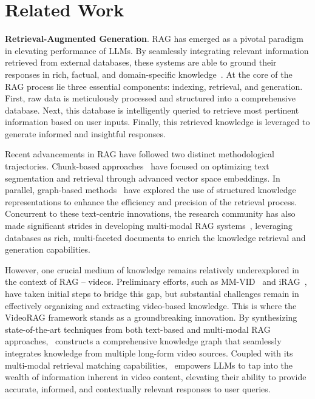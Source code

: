 \section{Related Work}

\textbf{Retrieval-Augmented Generation}. 
RAG has emerged as a pivotal paradigm in elevating performance of LLMs. By seamlessly integrating relevant information retrieved from external databases, these systems are able to ground their responses in rich, factual, and domain-specific knowledge~\cite{LightRAG, MemoRAG, RAGSurvey}. At the core of the RAG process lie three essential components: indexing, retrieval, and generation. First, raw data is meticulously processed and structured into a comprehensive database. Next, this database is intelligently queried to retrieve most pertinent information based on user inputs. Finally, this retrieved knowledge is leveraged to generate informed and insightful responses.

Recent advancements in RAG have followed two distinct methodological trajectories. Chunk-based approaches~\cite{NaiveRAG, ChunkRAG, RQ-RAG} have focused on optimizing text segmentation and retrieval through advanced vector space embeddings. In parallel, graph-based methods~\cite{GraphRAG, LightRAG, SubgraphRAG} have explored the use of structured knowledge representations to enhance the efficiency and precision of the retrieval process. Concurrent to these text-centric innovations, the research community has also made significant strides in developing multi-modal RAG systems~\cite{VisRAG, ColPali, MM-VID}, leveraging databases as rich, multi-faceted documents to enrich the knowledge retrieval and generation capabilities.

However, one crucial medium of knowledge remains relatively underexplored in the context of RAG – videos. Preliminary efforts, such as MM-VID~\cite{MM-VID} and iRAG~\cite{iRAG}, have taken initial steps to bridge this gap, but substantial challenges remain in effectively organizing and extracting video-based knowledge. This is where the VideoRAG framework stands as a groundbreaking innovation. By synthesizing state-of-the-art techniques from both text-based and multi-modal RAG approaches, \model\ constructs a comprehensive knowledge graph that seamlessly integrates knowledge from multiple long-form video sources. Coupled with its multi-modal retrieval matching capabilities, \model\ empowers LLMs to tap into the wealth of information inherent in video content, elevating their ability to provide accurate, informed, and contextually relevant responses to user queries.

